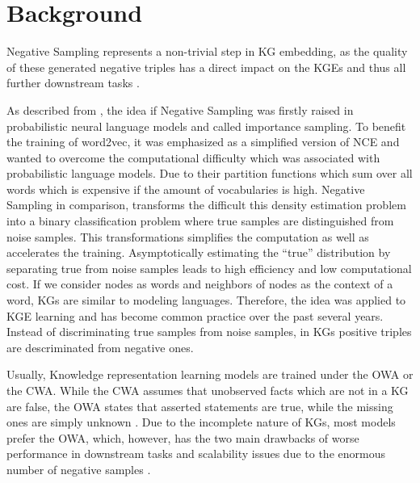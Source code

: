 \section{Background}
\label{sec:background}

Negative Sampling represents a non-trivial step in \ac{KG} embedding, as the quality of these generated negative triples has a direct impact on the \acp{KGE} and thus all further downstream tasks \cite{qiannegative}.

As described from \cite{qianunderstanding}, the idea if Negative Sampling was firstly raised in probabilistic neural language models and called importance sampling. 
To benefit the training of word2vec, it was emphasized as a simplified version of \ac{NCE}  and wanted to overcome the computational difficulty which was associated with probabilistic language models.
Due to their partition functions which sum over all words which is expensive if the amount of vocabularies is high.
Negative Sampling in comparison, transforms the difficult this density estimation problem into a binary classification problem where true samples are distinguished from noise samples.
This transformations simplifies the computation as well as accelerates the training.
Asymptotically estimating the “true” distribution by separating true from noise samples leads to high efficiency and low computational cost.
If we consider nodes as words and neighbors of nodes as the context of a word, \acp{KG} are similar to modeling languages.
Therefore, the idea was applied to \ac{KGE} learning and has become common practice over the past several years.
Instead of discriminating true samples from noise samples, in \acp{KG} positive triples are descriminated from negative ones.

Usually, Knowledge representation learning models are trained under the \ac{OWA} or the \ac{CWA}.
While the \ac{CWA} assumes that unobserved facts which are not in a \ac{KG} are false, the \ac{OWA} states that asserted statements are true, while the missing ones are simply unknown \cite{arnaout2020enriching, qiannegative}.
Due to the incomplete nature of \acp{KG}, most models prefer the \ac{OWA}, which, however, has the two main drawbacks of worse performance in downstream tasks and scalability issues due to the enormous number of negative samples \cite{qiannegative}.


